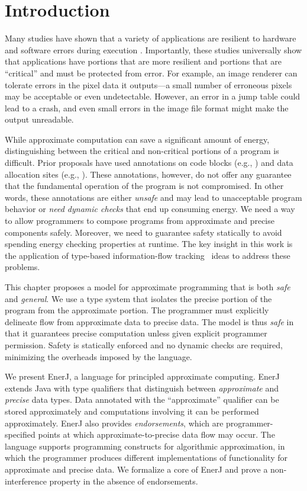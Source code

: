 

\section{Introduction}

Many studies have shown that a variety of applications are resilient
to hardware and software errors during execution
  \cite{li07, ersa, softcomputing,
  dekruijf-selse09, flikker, qosprof, relax, wong-selse06,
  perforationtr, rinard-onward}. Importantly, these studies
universally show that applications have portions that are more
resilient and portions that are ``critical'' and must be protected
from error.
For example, an image renderer can tolerate errors in the pixel
data it outputs---a small number of erroneous pixels may be acceptable
or even undetectable. However, an error in a jump table could lead to
a crash, and even small errors in the image file format might make the
output unreadable.

While approximate computation can save a significant amount of
energy, distinguishing
between the critical and non-critical portions of a program is
difficult. Prior
proposals have used annotations on code blocks (e.g., \cite{relax}) and
data allocation sites (e.g., \cite{flikker}). These annotations,
however, do not offer any guarantee that the fundamental operation of the
program is not compromised. In other words, these annotations are either
{\em unsafe} and may lead to unacceptable program behavior or {\em
  need dynamic checks} that end up consuming energy. We need a
way to allow programmers to compose programs from approximate
and precise components safely. Moreover, we need to guarantee safety statically
to avoid spending energy
checking properties at runtime. The key insight in this work is
the application of type-based information-flow tracking~\cite{infflow-survey}
ideas to address these problems.

This chapter proposes a model for approximate programming that is
both \emph{safe} and \emph{general}. We use a type system that
isolates the precise portion of the program from the
approximate portion. The programmer must explicitly delineate flow
from approximate data to precise data. The model is thus \emph{safe}
in that it guarantees precise computation unless given explicit
programmer permission.  Safety is
statically enforced and no dynamic checks are
required, minimizing the overheads imposed by
the language.

We present EnerJ, a language for principled approximate
computing.
EnerJ extends Java
with type qualifiers that distinguish between
\emph{approximate} and \emph{precise} data types.
Data annotated with the ``approximate'' qualifier can be stored
approximately and computations involving it can be performed
approximately. EnerJ also provides \emph{endorsements}, which are
programmer-specified points at which approximate-to-precise data flow
may occur. The language supports programming constructs for
algorithmic approximation, in which the programmer produces different
implementations of functionality for approximate and precise data.
We formalize a core of EnerJ and prove a
non-interference property in the absence of endorsements.

